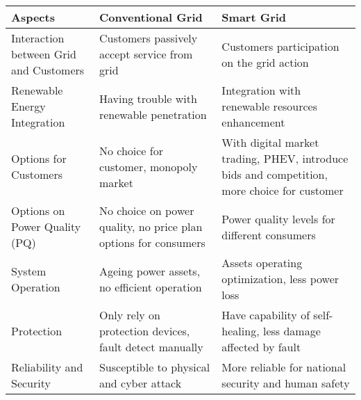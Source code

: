 

	\begin{tabular}{|p{3cm}|p{6cm}|p{6cm}|}
	\hline
	Aspects & Conventional Grid & Smart Grid \\
	\hline
	Interaction between Grid and Customers & Customers passively accept service from grid & Customers participation on the grid action \\
	\hline
	Renewable Energy Integration & Having trouble with renewable penetration & Integration with renewable resources enhancement \\
	\hline
	Options for Customers & No choice for customer, monopoly market & With digital market trading, PHEV, introduce bids and competition, more choice for customer \\
	\hline
	Options on Power Quality (PQ) & No choice on power quality, no price plan options for consumers & Power quality levels for different consumers \\
	\hline
	System Operation & Ageing power assets, no efficient operation & Assets operating optimization, less power loss \\
	\hline
	Protection & Only rely on protection devices, fault detect manually & Have capability of self-healing, less damage affected by fault \\
	\hline
	Reliability and Security & Susceptible to physical and cyber attack & More reliable for national security and human safety \\
	\hline
	\end{tabular}
